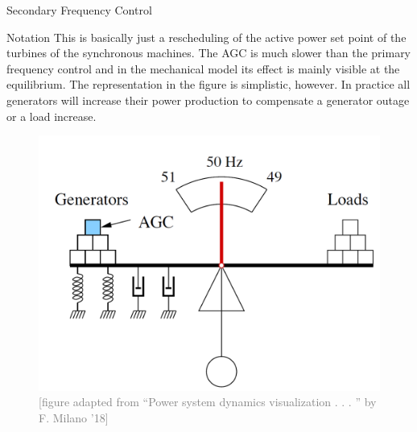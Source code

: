 \documentclass{beamer}
\begin{document}
\begin{frame}{Secondary Frequency Control}
\begin{block}{Notation}
{\tiny This is basically just a
rescheduling of the active power set point of the turbines of the synchronous machines. The AGC is
much slower than the primary frequency control and in the mechanical model its effect
is mainly visible at the equilibrium. The representation in the figure is simplistic, however. In practice all generators will increase their power production to compensate a generator outage or a load
increase.}
\end{block}

        \begin{figure}
        \includegraphics[scale=0.2]{Figures/SystemInertia3.PNG}
        \caption{\textcolor{gray}{\tiny [figure adapted from “Power system dynamics visualization . . . ” by F. Milano ’18]}}
        \end{figure}

\end{frame}
\end{document}
